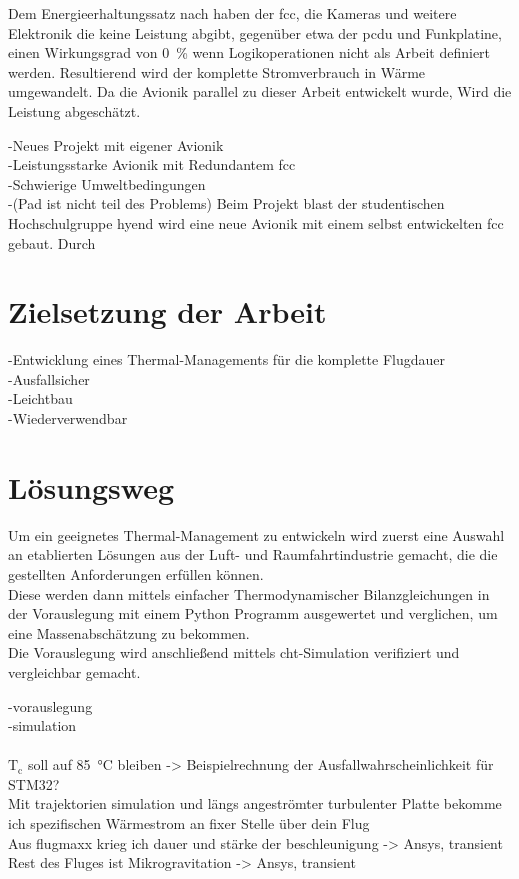Dem Energieerhaltungssatz nach haben der \ac{fcc}, die Kameras und weitere Elektronik die keine Leistung abgibt, gegenüber etwa
der \ac{pcdu} und Funkplatine, einen Wirkungsgrad von \SI{0}{\percent} wenn Logikoperationen nicht als Arbeit definiert werden.
Resultierend wird der komplette Stromverbrauch in Wärme umgewandelt. Da die Avionik parallel zu dieser Arbeit entwickelt wurde,
Wird die Leistung abgeschätzt.

-Neues Projekt mit eigener Avionik\\
-Leistungsstarke Avionik mit Redundantem \ac{fcc}\\
-Schwierige Umweltbedingungen\\
-(Pad ist nicht teil des Problems)
\newline
Beim Projekt \ac{blast} der studentischen Hochschulgruppe \ac{hyend} wird eine neue Avionik mit einem selbst entwickelten \ac{fcc} gebaut. Durch 



\section{Zielsetzung der Arbeit}

-Entwicklung eines Thermal-Managements für die komplette Flugdauer\\
-Ausfallsicher\\
-Leichtbau\\
-Wiederverwendbar

\section{Lösungsweg}

Um ein geeignetes Thermal-Management zu entwickeln wird zuerst eine Auswahl an etablierten Lösungen aus der Luft- und Raumfahrtindustrie
gemacht, die die gestellten Anforderungen erfüllen können.\\
Diese werden dann mittels einfacher Thermodynamischer Bilanzgleichungen in der Vorauslegung mit einem Python Programm ausgewertet und verglichen,
um eine Massenabschätzung zu bekommen.\\
Die Vorauslegung wird anschließend mittels \ac{cht}-Simulation verifiziert und vergleichbar gemacht.

-vorauslegung\\
-simulation\\
\cite{Claudio-2018, Ho-2021, Isaacs-2017, Abdel-2024, Xu-2022, Pavia-2015, Yang-2015, ST-guide, NASA-2023, Gilmore-2002, Hume-2022}\\
$\mathrm{T_c}$ soll auf \SI{85}{\celsius} bleiben -> Beispielrechnung der Ausfallwahrscheinlichkeit für STM32?\\
Mit trajektorien simulation und längs angeströmter turbulenter Platte bekomme ich spezifischen Wärmestrom an fixer Stelle über dein Flug\\
Aus flugmaxx krieg ich dauer und stärke der beschleunigung -> Ansys, transient\\
Rest des Fluges ist Mikrogravitation -> Ansys, transient\\